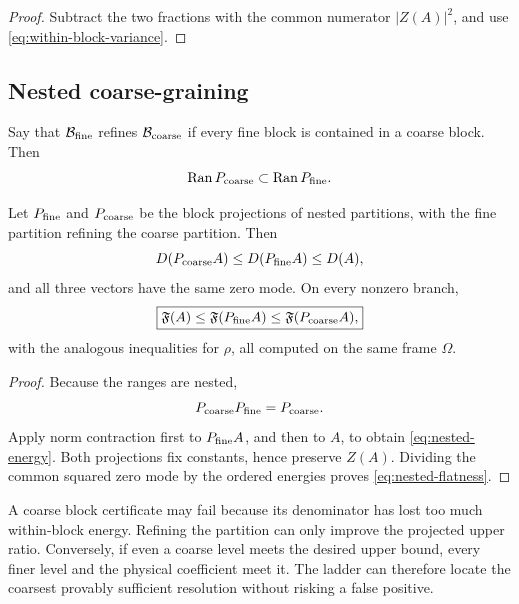 \begin{proof}
Subtract the two fractions with the common numerator
\(|Z(A)|^2\), and use \eqref{eq:within-block-variance}.
\end{proof}

\subsection{Nested coarse-graining}

Say that \(\mathcal B_{\rm fine}\) refines
\(\mathcal B_{\rm coarse}\) if every fine block is contained in a
coarse block.  Then
\[
 \operatorname{Ran} P_{\rm coarse}
 \subset
 \operatorname{Ran} P_{\rm fine}.
\]

\begin{theorem}
\label{thm:nested-monotonicity}
Let \(P_{\rm fine}\) and \(P_{\rm coarse}\) be the block projections
of nested partitions, with the fine partition refining the coarse
partition.  Then
\begin{equation}
 D(P_{\rm coarse}A)
 \le D(P_{\rm fine}A)
 \le D(A),
\label{eq:nested-energy}
\end{equation}
and all three vectors have the same zero mode.  On every nonzero
branch,
\begin{equation}
 \boxed{
 \mathfrak F(A)
 \le\mathfrak F(P_{\rm fine}A)
 \le\mathfrak F(P_{\rm coarse}A),}
\label{eq:nested-flatness}
\end{equation}
with the analogous inequalities for \(\rho\), all computed on the
same frame \(\Omega\).
\end{theorem}

\begin{proof}
Because the ranges are nested,
\[
 P_{\rm coarse}P_{\rm fine}=P_{\rm coarse}.
\]
Apply norm contraction first to \(P_{\rm fine}A\), and then to
\(A\), to obtain \eqref{eq:nested-energy}.  Both projections fix
constants, hence preserve \(Z(A)\).  Dividing the common squared
zero mode by the ordered energies proves
\eqref{eq:nested-flatness}.
\end{proof}

\begin{remark}
\label{rem:false-negatives}
A coarse block certificate may fail because its denominator has
lost too much within-block energy.  Refining the partition can only
improve the projected upper ratio.  Conversely, if even a coarse
level meets the desired upper bound, every finer level and the
physical coefficient meet it.  The ladder can therefore locate the
coarsest provably sufficient resolution without risking a false
positive.
\end{remark}

